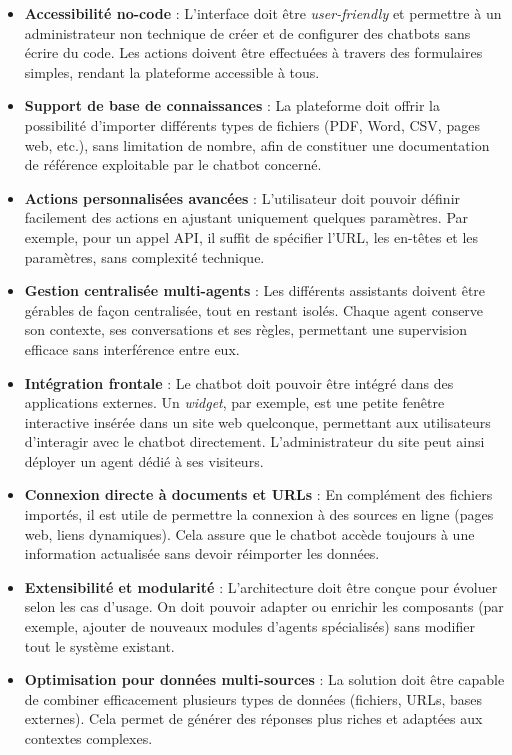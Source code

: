 \begin{itemize}[label=\textbullet]

  \item \textbf{Accessibilité no-code} :  
  L’interface doit être \emph{user-friendly} et permettre à un administrateur non technique de créer et de configurer des chatbots sans écrire du code. Les actions doivent être effectuées à travers des formulaires simples, rendant la plateforme accessible à tous.

  \item \textbf{Support de base de connaissances} :  
  La plateforme doit offrir la possibilité d’importer différents types de fichiers (PDF, Word, CSV, pages web, etc.), sans limitation de nombre, afin de constituer une documentation de référence exploitable par le chatbot concerné.

  \item \textbf{Actions personnalisées avancées} :  
  L’utilisateur doit pouvoir définir facilement des actions en ajustant uniquement quelques paramètres. Par exemple, pour un appel API, il suffit de spécifier l’URL, les en-têtes et les paramètres, sans complexité technique.

  \item \textbf{Gestion centralisée multi-agents} :  
  Les différents assistants doivent être gérables de façon centralisée, tout en restant isolés. Chaque agent conserve son contexte, ses conversations et ses règles, permettant une supervision efficace sans interférence entre eux.

  \item \textbf{Intégration frontale} :  
  Le chatbot doit pouvoir être intégré dans des applications externes. Un \emph{widget}, par exemple, est une petite fenêtre interactive insérée dans un site web quelconque, permettant aux utilisateurs d’interagir avec le chatbot directement. L’administrateur du site peut ainsi déployer un agent dédié à ses visiteurs.

  \item \textbf{Connexion directe à documents et URLs} :  
  En complément des fichiers importés, il est utile de permettre la connexion à des sources en ligne (pages web, liens dynamiques). Cela assure que le chatbot accède toujours à une information actualisée sans devoir réimporter les données.

  \item \textbf{Extensibilité et modularité} :  
  L’architecture doit être conçue pour évoluer selon les cas d’usage. On doit pouvoir adapter ou enrichir les composants (par exemple, ajouter de nouveaux modules d’agents spécialisés) sans modifier tout le système existant.

  \item \textbf{Optimisation pour données multi-sources} :  
  La solution doit être capable de combiner efficacement plusieurs types de données (fichiers, URLs, bases externes). Cela permet de générer des réponses plus riches et adaptées aux contextes complexes.

\end{itemize}


